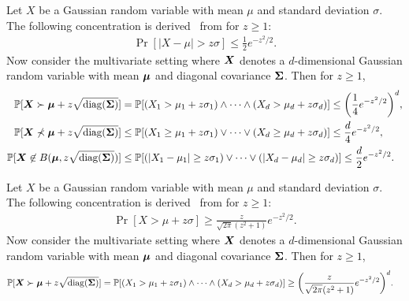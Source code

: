 \begin{fact}
\label{fac:concentration}
    Let $X$ be a Gaussian random variable with mean $\mu$ and standard deviation $\sigma$. The following concentration is derived~\cite{Agrawal2013} from \cite{Abramowitz1964} for $z \geq 1$:
    \begin{align*}
        \Pr[|X - \mu| > z \sigma] \leq \frac{1}{2} e^{-z^2/2}.
    \end{align*}
    Now consider the multivariate setting where $\boldsymbol{X}$ denotes a $d$-dimensional Gaussian random variable with mean $\boldsymbol{\mu}$ and diagonal covariance $\boldsymbol{\Sigma}$. Then for $z \geq 1$,
    \begin{align*}
        \mathbb{P}[\boldsymbol{X} \succ \boldsymbol{\mu} + z \sqrt{\mathrm{diag}(\boldsymbol{\Sigma})}]
        & = \mathbb{P}[(X_1 > \mu_1 + z \sigma_1) \wedge \dots \wedge (X_d > \mu_d + z \sigma_d)]
        \leq \bigg( \frac{1}{4} e^{-z^2/2} \bigg)^d, \\
        \mathbb{P}[\boldsymbol{X} \not\prec \boldsymbol{\mu} + z \sqrt{\mathrm{diag}(\boldsymbol{\Sigma})}]
        & \leq \mathbb{P}[(X_1 \geq \mu_1 + z \sigma_1) \vee \dots \vee (X_d \geq \mu_d + z \sigma_d)]
        \leq \frac{d}{4} e^{-z^2/2}, \\
        \mathbb{P}[\boldsymbol{X} \not\in B(\boldsymbol{\mu}, z \sqrt{\mathrm{diag}(\boldsymbol{\Sigma})})]
        & \leq \mathbb{P}[(|X_1 - \mu_1| \geq z \sigma_1) \vee \dots \vee (|X_d - \mu_d| \geq z \sigma_d)]
        \leq \frac{d}{2} e^{-z^2/2}.
    \end{align*}
\end{fact}

\begin{fact}
\label{fac:anti_concentration}
    Let $X$ be a Gaussian random variable with mean $\mu$ and standard deviation $\sigma$. The following concentration is derived~\cite{Agrawal2013} from \cite{Abramowitz1964} for $z \geq 1$:
    \begin{align*}
        \Pr[X > \mu + z \sigma] \geq \frac{z}{\sqrt{2 \pi} (z^2 + 1)} e^{-z^2/2}.
    \end{align*}
    Now consider the multivariate setting where $\boldsymbol{X}$ denotes a $d$-dimensional Gaussian random variable with mean $\boldsymbol{\mu}$ and diagonal covariance $\boldsymbol{\Sigma}$. Then for $z \geq 1$,
    \begin{align*}
        \mathbb{P}[\boldsymbol{X} \succ \boldsymbol{\mu} + z \sqrt{\mathrm{diag}(\boldsymbol{\Sigma})}]
        & = \mathbb{P}[(X_1 > \mu_1 + z \sigma_1) \wedge \dots \wedge (X_d > \mu_d + z \sigma_d)]
        \geq \bigg( \frac{z}{\sqrt{2 \pi} (z^2 + 1)} e^{-z^2/2} \bigg)^d.
    \end{align*}
\end{fact}


